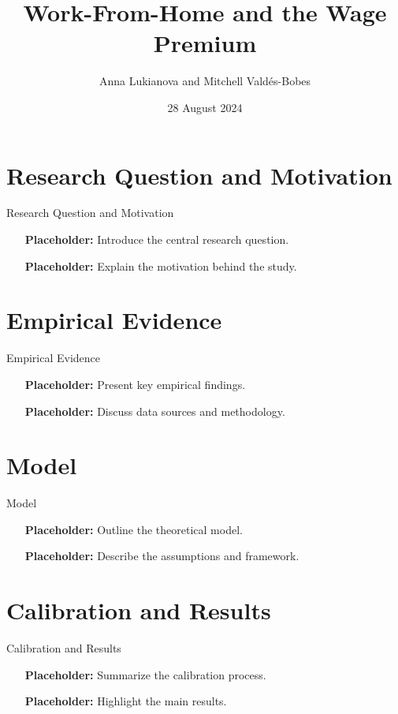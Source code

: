\documentclass[aspectratio=1610]{beamer}
\title{Work-From-Home and the Wage Premium}
\author{Anna Lukianova and Mitchell Vald\'es-Bobes}
\date{28 August 2024}
\begin{document}
{
  \begin{frame}
    \titlepage
  \end{frame}
}
\addtocounter{framenumber}{-1}

\section{Research Question and Motivation}
\begin{frame}{Research Question and Motivation}
  \begin{itemize}
    \item [\textbf{Placeholder:}] Introduce the central research question.
    \item [\textbf{Placeholder:}] Explain the motivation behind the study.
  \end{itemize}
\end{frame}

\section{Empirical Evidence}
\begin{frame}{Empirical Evidence}
  \begin{itemize}
    \item [\textbf{Placeholder:}] Present key empirical findings.
    \item [\textbf{Placeholder:}] Discuss data sources and methodology.
  \end{itemize}
\end{frame}

\section{Model}
\begin{frame}{Model}
  \begin{itemize}
    \item [\textbf{Placeholder:}] Outline the theoretical model.
    \item [\textbf{Placeholder:}] Describe the assumptions and framework.
  \end{itemize}
\end{frame}

\section{Calibration and Results}
\begin{frame}{Calibration and Results}
  \begin{itemize}
    \item [\textbf{Placeholder:}] Summarize the calibration process.
    \item [\textbf{Placeholder:}] Highlight the main results.
  \end{itemize}
\end{frame}
\end{document}
